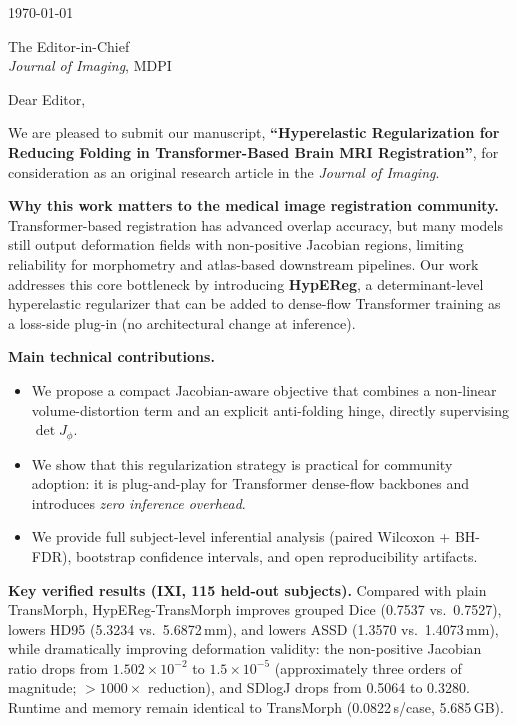 \documentclass[11pt,a4paper]{article}
\begin{document}
\thispagestyle{empty}

\today

\vspace{0.8em}

\noindent The Editor-in-Chief\\
\textit{Journal of Imaging}, MDPI

\vspace{0.8em}

\noindent Dear Editor,

\vspace{0.5em}

We are pleased to submit our manuscript, \textbf{``Hyperelastic Regularization for Reducing Folding in Transformer-Based Brain MRI Registration''}, for consideration as an original research article in the \textit{Journal of Imaging}.

\vspace{0.5em}
\noindent\textbf{Why this work matters to the medical image registration community.}
Transformer-based registration has advanced overlap accuracy, but many models still output deformation fields with non-positive Jacobian regions, limiting reliability for morphometry and atlas-based downstream pipelines. Our work addresses this core bottleneck by introducing \textbf{HypEReg}, a determinant-level hyperelastic regularizer that can be added to dense-flow Transformer training as a loss-side plug-in (no architectural change at inference).

\vspace{0.5em}
\noindent\textbf{Main technical contributions.}
\begin{itemize}
\item We propose a compact Jacobian-aware objective that combines a non-linear volume-distortion term and an explicit anti-folding hinge, directly supervising \(\det J_\phi\).
\item We show that this regularization strategy is practical for community adoption: it is plug-and-play for Transformer dense-flow backbones and introduces \emph{zero inference overhead}.
\item We provide full subject-level inferential analysis (paired Wilcoxon + BH-FDR), bootstrap confidence intervals, and open reproducibility artifacts.
\end{itemize}

\vspace{0.2em}
\noindent\textbf{Key verified results (IXI, 115 held-out subjects).}
Compared with plain TransMorph, HypEReg-TransMorph improves grouped Dice (0.7537 vs.\ 0.7527), lowers HD95 (5.3234 vs.\ 5.6872\,mm), and lowers ASSD (1.3570 vs.\ 1.4073\,mm), while dramatically improving deformation validity: the non-positive Jacobian ratio drops from \(1.502\times10^{-2}\) to \(1.5\times10^{-5}\) (approximately three orders of magnitude; \(>1000\times\) reduction), and SDlogJ drops from 0.5064 to 0.3280. Runtime and memory remain identical to TransMorph (0.0822\,s/case, 5.685\,GB).
\end{document}
